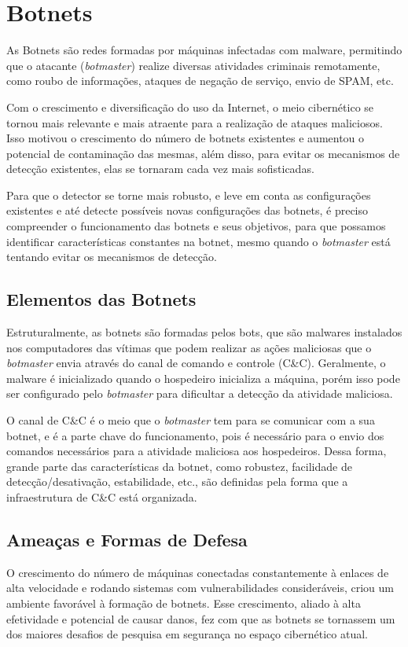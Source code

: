 \chapter{Botnets}
As Botnets são redes formadas por máquinas infectadas com malware, permitindo que o atacante (\textit{botmaster}) realize diversas atividades criminais remotamente, como roubo de informações, ataques de negação de serviço, envio de SPAM, etc.\cite{silva2013botnets}

Com o crescimento e diversificação do uso da Internet, o meio cibernético se tornou mais relevante e mais atraente para a realização de ataques maliciosos. Isso motivou o crescimento do número de botnets existentes e aumentou o potencial de contaminação das mesmas, além disso, para evitar os mecanismos de detecção existentes, elas se tornaram cada vez mais sofisticadas.

Para que o detector se torne mais robusto, e leve em conta as configurações existentes e até detecte possíveis novas configurações das botnets, é preciso compreender o funcionamento das botnets e seus objetivos, para que possamos identificar características constantes na botnet, mesmo quando o \textit{botmaster} está tentando evitar os mecanismos de detecção.

\section{Elementos das Botnets}
Estruturalmente, as botnets são formadas pelos bots, que são malwares instalados nos computadores das vítimas que podem realizar as ações maliciosas que o \textit{botmaster} envia através do canal de comando e controle (C\&C). Geralmente, o malware é inicializado quando o hospedeiro inicializa a máquina, porém isso pode ser configurado pelo \textit{botmaster} para dificultar a detecção da atividade maliciosa.

O canal de C\&C é o meio que o \textit{botmaster} tem para se comunicar com a sua botnet, e é a parte chave do funcionamento, pois é necessário para o envio dos comandos necessários para a atividade maliciosa aos hospedeiros. Dessa forma, grande parte das características da botnet, como robustez, facilidade de detecção/desativação, estabilidade, etc., são definidas pela forma que a infraestrutura de C\&C está organizada.

\section{Ameaças e Formas de Defesa}
O crescimento do número de máquinas conectadas constantemente à enlaces de alta velocidade e rodando sistemas com vulnerabilidades consideráveis, criou um ambiente favorável à formação de botnets. Esse crescimento, aliado à alta efetividade e potencial de causar danos, fez com que as botnets se tornassem um dos maiores desafios de pesquisa em segurança no espaço cibernético atual. \cite{soltani2014survey}

